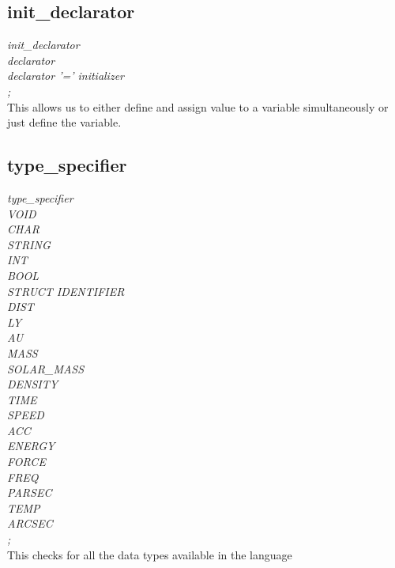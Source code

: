 \documentclass[11pt]{article}
\begin{document}
\subsection{init\_declarator}
{\itshape
init\_declarator\\
\hspace*{1cm} declarator\\
\hspace*{1cm}   declarator '=' initializer\\
\hspace*{1cm};\\
}
This allows us to either define and assign value to a variable simultaneously or just define the variable.
\subsection{type\_specifier}
{\itshape
type\_specifier\\
\hspace*{1cm} VOID\\
\hspace*{1cm}   CHAR\\
\hspace*{1cm}   STRING\\
\hspace*{1cm}   INT\\
\hspace*{1cm}   BOOL\\
\hspace*{1cm}   STRUCT IDENTIFIER\\
\hspace*{1cm}   DIST\\
\hspace*{1cm}   LY\\
\hspace*{1cm}   AU\\
\hspace*{1cm}   MASS\\
\hspace*{1cm}   SOLAR\_MASS\\
\hspace*{1cm}   DENSITY\\
\hspace*{1cm}   TIME\\
\hspace*{1cm}   SPEED\\
\hspace*{1cm}   ACC\\
\hspace*{1cm}   ENERGY\\
\hspace*{1cm}   FORCE\\
\hspace*{1cm}   FREQ\\
\hspace*{1cm}   PARSEC\\
\hspace*{1cm}   TEMP\\
\hspace*{1cm}   ARCSEC\\
\hspace*{1cm};\\
}
This checks for all the data types available in the language
\end{document}
